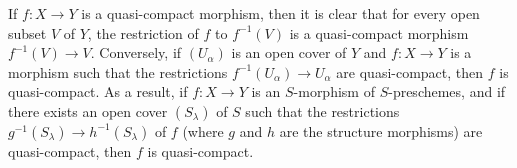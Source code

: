 If $f:X\to Y$ is a quasi-compact morphism, then it is clear that for every open subset $V$ of $Y$, the restriction of $f$ to $f^{-1}(V)$ is a quasi-compact morphism $f^{-1}(V)\to V$.
Conversely, if $(U_\alpha)$ is an open cover of $Y$ and $f:X\to Y$ is a morphism such that the restrictions $f^{-1}(U_\alpha)\to U_\alpha$ are quasi-compact, then $f$ is quasi-compact.
As
a result, if $f:X\to Y$ is an $S$-morphism of $S$-preschemes, and if there exists an open cover $(S_\lambda)$ of $S$ such that the restrictions $g^{-1}(S_\lambda)\to h^{-1}(S_\lambda)$ of $f$ (where $g$ and $h$ are the structure morphisms) are quasi-compact, then $f$ is quasi-compact.



